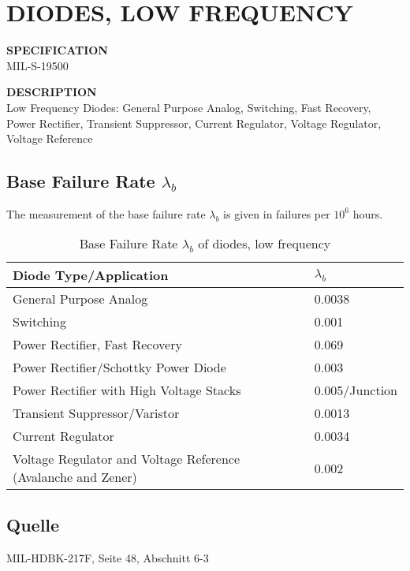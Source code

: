 \section{DIODES, LOW FREQUENCY}

\begin{minipage}[t]{0.29\textwidth}
    \textbf{SPECIFICATION}\\
    MIL-S-19500
\end{minipage}
\begin{minipage}[t]{0.7\textwidth}
    \textbf{DESCRIPTION}\\
    {\fontsize{12pt}{12pt}\selectfont Low Frequency Diodes: General Purpose Analog, Switching, Fast Recovery, Power Rectifier,
    Transient Suppressor, Current Regulator, Voltage Regulator, Voltage Reference}
\end{minipage}

\subsection{Base Failure Rate $\lambda_b$}
The measurement of the base failure rate $\lambda_b$ is given in failures per $10^6$ hours.
\begin{table}[ht]
{\centering

\begin{tabular}{|p{7.5cm}|p{3cm}|}
    \hline
    \textbf{Diode Type/Application} & \textbf{$\lambda_b$} \\
    \hline
    General Purpose Analog & 0.0038 \\
    \hline
    Switching & 0.001 \\
    \hline
    Power Rectifier, Fast Recovery & 0.069 \\
    \hline
    Power Rectifier/Schottky Power Diode & 0.003 \\
    \hline
    Power Rectifier with High Voltage Stacks & 0.005/Junction \\
    \hline
    Transient Suppressor/Varistor & 0.0013 \\
    \hline
    Current Regulator & 0.0034 \\
    \hline
    Voltage Regulator and Voltage Reference (Avalanche and Zener) & 0.002 \\
    \hline
\end{tabular}

\caption{Base Failure Rate $\lambda_b$ of diodes, low frequency}
\label{tab:bfr_diodes_low_frequency}
\par}
\subsection*{Quelle}
MIL-HDBK-217F, Seite 48, Abschnitt 6-3

\end{table}